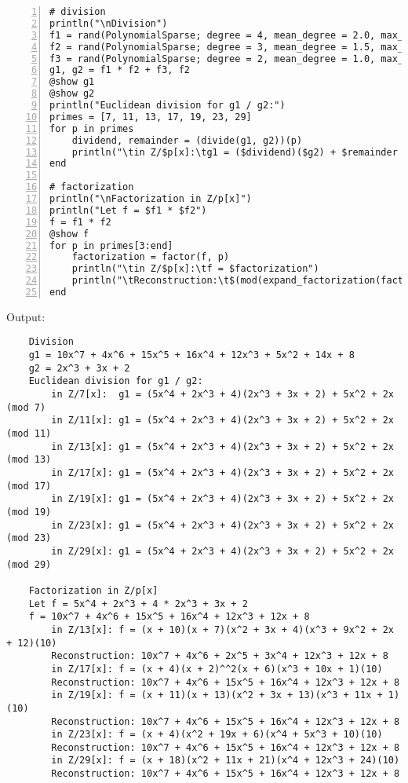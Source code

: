 \documentclass{article}
\theoremstyle{plain}
\numberwithin{theorem}{section}
\numberwithin{example}{section}
\theoremstyle{definition}
\numberwithin{definition}{section}
\begin{document}
\begin{codebox}
    \begin{Verbatim}[numbers=left,xleftmargin=5mm]
# division
println("\nDivision")
f1 = rand(PolynomialSparse; degree = 4, mean_degree = 2.0, max_coeff = 5)
f2 = rand(PolynomialSparse; degree = 3, mean_degree = 1.5, max_coeff = 5)
f3 = rand(PolynomialSparse; degree = 2, mean_degree = 1.0, max_coeff = 5)
g1, g2 = f1 * f2 + f3, f2
@show g1
@show g2
println("Euclidean division for g1 / g2:")
primes = [7, 11, 13, 17, 19, 23, 29]
for p in primes
    dividend, remainder = (divide(g1, g2))(p)
    println("\tin Z/$p[x]:\tg1 = ($dividend)($g2) + $remainder  (mod $p)")
end

# factorization
println("\nFactorization in Z/p[x]")
println("Let f = $f1 * $f2")
f = f1 * f2
@show f
for p in primes[3:end]
    factorization = factor(f, p)
    println("\tin Z/$p[x]:\tf = $factorization")
    println("\tReconstruction:\t$(mod(expand_factorization(factorization), p))")
end
    \end{Verbatim}
\end{codebox}

Output:
\begin{Verbatim}
    Division
    g1 = 10x^7 + 4x^6 + 15x^5 + 16x^4 + 12x^3 + 5x^2 + 14x + 8
    g2 = 2x^3 + 3x + 2
    Euclidean division for g1 / g2:
        in Z/7[x]:	g1 = (5x^4 + 2x^3 + 4)(2x^3 + 3x + 2) + 5x^2 + 2x  (mod 7)
        in Z/11[x]:	g1 = (5x^4 + 2x^3 + 4)(2x^3 + 3x + 2) + 5x^2 + 2x  (mod 11)
        in Z/13[x]:	g1 = (5x^4 + 2x^3 + 4)(2x^3 + 3x + 2) + 5x^2 + 2x  (mod 13)
        in Z/17[x]:	g1 = (5x^4 + 2x^3 + 4)(2x^3 + 3x + 2) + 5x^2 + 2x  (mod 17)
        in Z/19[x]:	g1 = (5x^4 + 2x^3 + 4)(2x^3 + 3x + 2) + 5x^2 + 2x  (mod 19)
        in Z/23[x]:	g1 = (5x^4 + 2x^3 + 4)(2x^3 + 3x + 2) + 5x^2 + 2x  (mod 23)
        in Z/29[x]:	g1 = (5x^4 + 2x^3 + 4)(2x^3 + 3x + 2) + 5x^2 + 2x  (mod 29)

    Factorization in Z/p[x]
    Let f = 5x^4 + 2x^3 + 4 * 2x^3 + 3x + 2
    f = 10x^7 + 4x^6 + 15x^5 + 16x^4 + 12x^3 + 12x + 8
        in Z/13[x]:	f = (x + 10)(x + 7)(x^2 + 3x + 4)(x^3 + 9x^2 + 2x + 12)(10)
        Reconstruction:	10x^7 + 4x^6 + 2x^5 + 3x^4 + 12x^3 + 12x + 8
        in Z/17[x]:	f = (x + 4)(x + 2)^^2(x + 6)(x^3 + 10x + 1)(10)
        Reconstruction:	10x^7 + 4x^6 + 15x^5 + 16x^4 + 12x^3 + 12x + 8
        in Z/19[x]:	f = (x + 11)(x + 13)(x^2 + 3x + 13)(x^3 + 11x + 1)(10)
        Reconstruction:	10x^7 + 4x^6 + 15x^5 + 16x^4 + 12x^3 + 12x + 8
        in Z/23[x]:	f = (x + 4)(x^2 + 19x + 6)(x^4 + 5x^3 + 10)(10)
        Reconstruction:	10x^7 + 4x^6 + 15x^5 + 16x^4 + 12x^3 + 12x + 8
        in Z/29[x]:	f = (x + 18)(x^2 + 11x + 21)(x^4 + 12x^3 + 24)(10)
        Reconstruction:	10x^7 + 4x^6 + 15x^5 + 16x^4 + 12x^3 + 12x + 8
\end{Verbatim}
\end{document}
